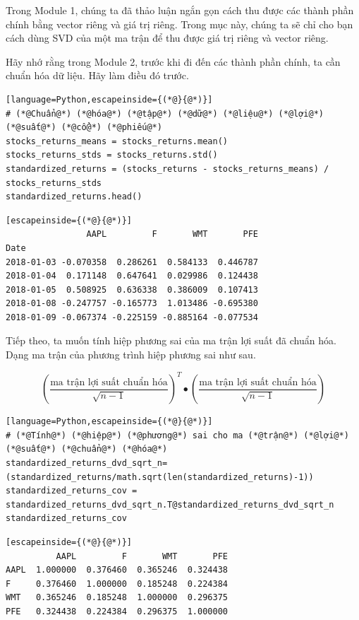 Trong Module 1, chúng ta đã thảo luận ngắn gọn cách thu được các thành phần chính bằng vector riêng và giá trị riêng. Trong mục này, chúng ta sẽ chỉ cho bạn cách dùng SVD của một ma trận để thu được giá trị riêng và vector riêng.

Hãy nhớ rằng trong Module 2, trước khi đi đến các thành phần chính, ta cần chuẩn hóa dữ liệu. Hãy làm điều đó trước.

\begin{lstlisting}[language=Python,escapeinside={(*@}{@*)}]
# (*@Chuẩn@*) (*@hóa@*) (*@tập@*) (*@dữ@*) (*@liệu@*) (*@lợi@*) (*@suất@*) (*@cổ@*) (*@phiếu@*)
stocks_returns_means = stocks_returns.mean()
stocks_returns_stds = stocks_returns.std()
standardized_returns = (stocks_returns - stocks_returns_means) / stocks_returns_stds
standardized_returns.head()
\end{lstlisting}

\begin{lstlisting}[escapeinside={(*@}{@*)}]
                AAPL         F       WMT       PFE
Date                                              
2018-01-03 -0.070358  0.286261  0.584133  0.446787
2018-01-04  0.171148  0.647641  0.029986  0.124438
2018-01-05  0.508925  0.636338  0.386009  0.107413
2018-01-08 -0.247757 -0.165773  1.013486 -0.695380
2018-01-09 -0.067374 -0.225159 -0.885164 -0.077534
\end{lstlisting}

Tiếp theo, ta muốn tính hiệp phương sai của ma trận lợi suất đã chuẩn hóa. Dạng ma trận của phương trình hiệp phương sai như sau.

\[
\left( \frac{\text{ma trận lợi suất chuẩn hóa}}{\sqrt{n-1}} \right)^{T}\bullet \left( \frac{\text{ma trận lợi suất chuẩn hóa}}{\sqrt{n-1}} \right)
\]

\begin{lstlisting}[language=Python,escapeinside={(*@}{@*)}]
# (*@Tính@*) (*@hiệp@*) (*@phương@*) sai cho ma (*@trận@*) (*@lợi@*) (*@suất@*) (*@chuẩn@*) (*@hóa@*)
standardized_returns_dvd_sqrt_n=(standardized_returns/math.sqrt(len(standardized_returns)-1))
standardized_returns_cov = standardized_returns_dvd_sqrt_n.T@standardized_returns_dvd_sqrt_n
standardized_returns_cov
\end{lstlisting}

\begin{lstlisting}[escapeinside={(*@}{@*)}]
          AAPL         F       WMT       PFE
AAPL  1.000000  0.376460  0.365246  0.324438
F     0.376460  1.000000  0.185248  0.224384
WMT   0.365246  0.185248  1.000000  0.296375
PFE   0.324438  0.224384  0.296375  1.000000
\end{lstlisting}

